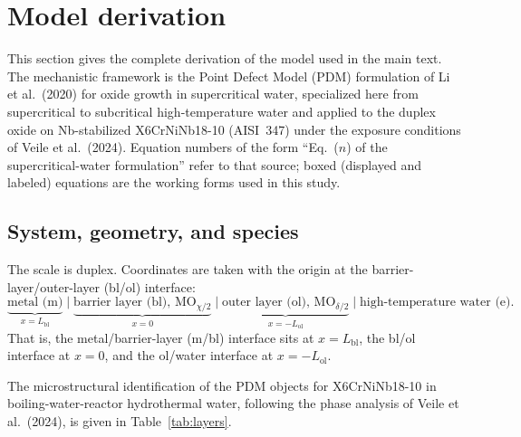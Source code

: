 \section{Model derivation}
\label{sec:derivation}

This section gives the complete derivation of the model used in the main text.
The mechanistic framework is the Point Defect Model (PDM) formulation of
Li et al.\ (2020) for oxide growth in supercritical water, specialized here from
supercritical to subcritical high-temperature water and applied to the duplex
oxide on Nb-stabilized X6CrNiNb18-10 (AISI~347) under the exposure conditions of
Veile et al.\ (2024). Equation numbers of the form ``Eq.~($n$) of the
supercritical-water formulation'' refer to that source; boxed (displayed and
labeled) equations are the working forms used in this study.

\subsection{System, geometry, and species}
\label{sec:geometry}

The scale is duplex. Coordinates are taken with the origin at the
barrier-layer/outer-layer (bl/ol) interface:
\begin{equation}
\underbrace{\text{metal (m)}}_{x = L_{\mathrm{bl}}}
\;\Big|\;
\underbrace{\text{barrier layer (bl), } \mathrm{MO}_{\chi/2}}_{x = 0}
\;\Big|\;
\underbrace{\text{outer layer (ol), } \mathrm{MO}_{\delta/2}}_{x = -L_{\mathrm{ol}}}
\;\Big|\;
\text{high-temperature water (e)} .
\end{equation}
That is, the metal/barrier-layer (m/bl) interface sits at $x = L_{\mathrm{bl}}$,
the bl/ol interface at $x = 0$, and the ol/water interface at
$x = -L_{\mathrm{ol}}$.

The microstructural identification of the PDM objects for X6CrNiNb18-10 in
boiling-water-reactor hydrothermal water, following the phase analysis of
Veile et al.\ (2024), is given in Table~\ref{tab:layers}.

